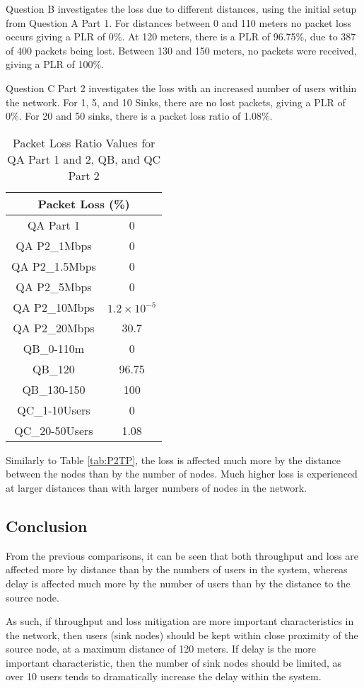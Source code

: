 \par Question B investigates the loss due to different distances, using
the initial setup from Question A Part 1. For distances between 0 and 110 meters
no packet loss occurs giving a PLR of 0\%. At 120 meters, there is a PLR of
96.75\%, due to 387 of 400 packets being lost. Between 130 and 150 meters, no
packets were received, giving a PLR of 100\%.

\par Question C Part 2 investigates the loss with an increased number of
users within the network. For 1, 5, and 10 Sinks, there are no lost packets,
giving a PLR of 0\%. For 20 and 50 sinks, there is a packet loss ratio of
1.08\%.

\begin{table}[H]
	\centering
	\caption{Packet Loss Ratio Values for QA Part 1 and 2, QB, and QC Part 2}
	\label{tab:P2PLR}
	\begin{tabular}{|c|c|}
		\hline
		\multicolumn{2}{|c|}{Packet Loss (\%)} \\
		\hline
		QA Part 1 & 0 \\
		QA P2_{1Mbps} & 0\\
		QA P2_{1.5Mbps} & 0\\
		QA P2_{5Mbps} & 0\\
		QA P2_{10Mbps} & $1.2\times10^{-5}$\\
		QA P2_{20Mbps} & 30.7\\
		QB_{0-110m} & 0\\
		QB_{120} & 96.75\\
		QB_{130-150} & 100\\
		QC_{1-10Users} & 0 \\
		QC_{20-50Users} & 1.08 \\
		\hline
	\end{tabular}
\end{table}

Similarly to Table \ref{tab:P2TP}, the loss is affected much more by the
distance between the nodes than by the number of nodes. Much higher loss is
experienced at larger distances than with larger numbers of nodes in the
network.

\subsection{Conclusion}

From the previous comparisons, it can be seen that both throughput and loss are
affected more by distance than by the numbers of users in the system, whereas
delay is affected much more by the number of users than by the distance to the
source node.

As such, if throughput and loss mitigation are more important characteristics in
the network, then users (sink nodes) should be kept within close proximity of
the source node, at a maximum distance of 120 meters. If delay is the more
important characteristic, then the number of sink nodes should be limited, as
over 10 users tends to dramatically increase the delay within the system.
